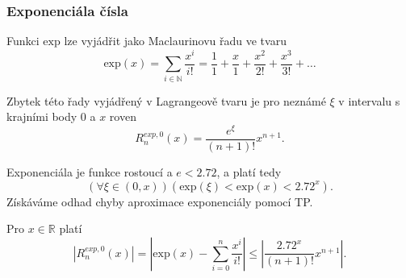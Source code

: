 \subsubsection{Exponenciála čísla}

\begin{fact}\label{vet:exp_jako_rada}
Funkci $\mathrm{exp}$ lze vyjádřit jako Maclaurinovu řadu ve tvaru
\begin{equation}
\mathrm{exp}(x) = \underset{i \in \mathbb{N}}{\sum} \frac{x^i}{i!} = \frac{1}{1} + \frac{x}{1} + \frac{x^2}{2!} + \frac{x^3}{3!} + \ldots
\end{equation}
\end{fact}

Zbytek této řady vyjádřený v Lagrangeově tvaru je pro neznámé $\xi$ v intervalu s krajními body $0$ a $x$ roven
\begin{equation}
R_n^{exp, 0}(x) = \frac{e^\xi}{(n+1)!}x^{n+1}.
\end{equation}

Exponenciála je funkce rostoucí a $e<2.72$, a platí tedy
\begin{equation}
(\forall\xi\in (0,x))(\mathrm{exp}(\xi)<\mathrm{exp}(x) < 2.72^x).
\end{equation}
Získáváme odhad chyby aproximace exponenciály pomocí TP.
\begin{fact}
Pro $x\in\mathbb{R}$ platí
\begin{equation}
|R_n^{exp, 0}(x)| = \left|\mathrm{exp}(x)- \sum_{i=0}^n \frac{x^i}{i!}\right| \leq \left| \frac{2.72^x}{(n+1)!}x^{n+1} \right|.
\end{equation}
\end{fact}

